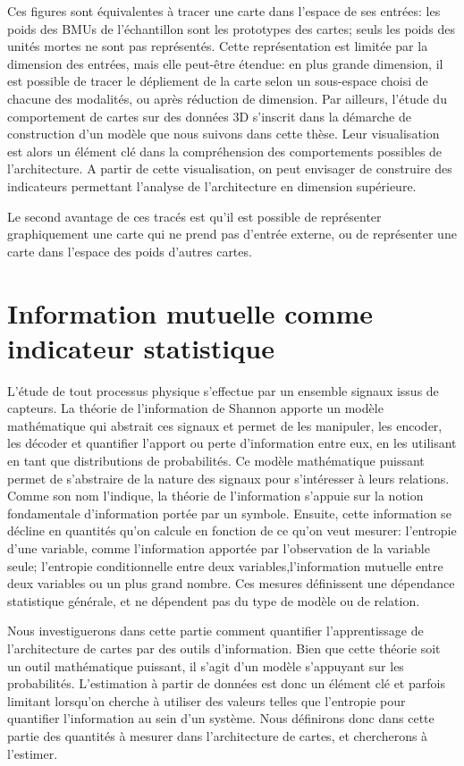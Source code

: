 Ces figures sont équivalentes à tracer une carte dans l'espace de ses entrées: les poids des BMUs de l'échantillon sont les prototypes des cartes; seuls les poids des unités mortes ne sont pas représentés.
Cette représentation est limitée par la dimension des entrées, mais elle peut-être étendue: en plus grande dimension, il est possible de tracer le dépliement de la carte selon un sous-espace choisi de chacune des modalités, ou après réduction de dimension.
Par ailleurs, l'étude du comportement de cartes sur des données 3D s'inscrit dans la démarche de construction d'un modèle que nous suivons dans cette thèse. Leur visualisation est alors un élément clé dans la compréhension des comportements possibles de l'architecture. A partir de cette visualisation, on peut envisager de construire des indicateurs permettant l'analyse de l'architecture en dimension supérieure. 

Le second avantage de ces tracés est qu'il est possible de représenter graphiquement une carte qui ne prend pas d'entrée externe, ou de représenter une carte dans l'espace des poids d'autres cartes.

\section{Information mutuelle comme indicateur statistique}

L'étude de tout processus physique s'effectue par un ensemble signaux issus de capteurs. La théorie de l'information de Shannon \cite{Shannon1948AMT} apporte un modèle mathématique qui abstrait ces signaux et permet de les manipuler, les encoder, les décoder et quantifier l'apport ou perte d'information entre eux, en les utilisant en tant que distributions de probabilités.
Ce modèle mathématique puissant permet de s'abstraire de la nature des signaux pour s'intéresser à leurs relations. Comme son nom l'indique, la théorie de l'information s'appuie sur la notion fondamentale d'information portée par un symbole. Ensuite, cette information se décline en quantités qu'on calcule en fonction de ce qu'on veut mesurer: l'entropie d'une variable, comme l'information apportée par l'observation de la variable seule; l'entropie conditionnelle entre deux variables,l'information mutuelle entre deux variables ou un plus grand nombre. Ces mesures définissent une dépendance statistique générale, et ne dépendent pas du type de modèle ou de relation.

Nous investiguerons dans cette partie comment quantifier l'apprentissage de l'architecture de cartes par des outils d'information. Bien que cette théorie soit un outil mathématique puissant, il s'agit d'un modèle s'appuyant sur les probabilités. L'estimation à partir de données est donc un élément clé et parfois limitant lorsqu'on cherche à utiliser des valeurs telles que l'entropie pour quantifier l'information au sein d'un système. Nous définirons donc dans cette partie des quantités à mesurer dans l'architecture de cartes, et chercherons à l'estimer.

